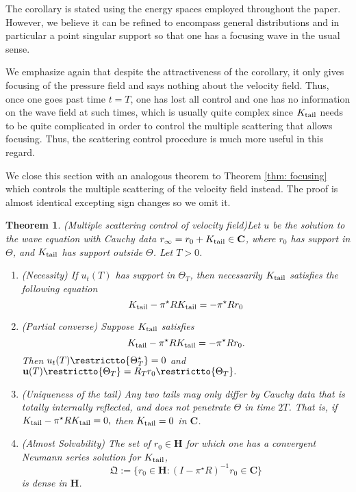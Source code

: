 \documentclass[10pt]{article}
\theoremstyle{plain}
\newtheorem{theorem}{Theorem}
\theoremstyle{definition}
\theoremstyle{remark}
\numberwithin{theorem}{section}
\numberwithin{example}{section}
\numberwithin{equation}{section}
\numberwithin{figure}{section}
\def\beq{\begin{equation} }
\def\eeq{\end{equation}}
\newcommand\tail{_{\textup{tail}}}
\begin{document}
The corollary is stated using the energy spaces employed throughout the paper. However, we believe it can be refined to encompass general distributions and in particular a point singular support so that one has a focusing wave in the usual sense.
\begin{rem}
We emphasize again that despite the attractiveness of the corollary, it only gives focusing of the pressure field and says nothing about the velocity field. Thus, once one goes past time $t=T$, one has lost all control and one has no information on the wave field at such times, which is usually quite complex since $K\tail$ needs to be quite complicated in order to control the multiple scattering that allows focusing. Thus, the scattering control procedure is much more useful in this regard.
\end{rem}

We close this section with an analogous theorem to Theorem \ref{thm: focusing} which controls the multiple scattering of the velocity field instead. The proof is almost identical excepting sign changes so we omit it.
\begin{theorem} (Multiple scattering control of velocity field)\label{thm: focusing velocity}
 Let $u$ be the solution to the wave equation with Cauchy data $r_{\infty} = r_0 + K\tail \in \mathbf{C}$, where $r_0$ has support in $\Theta$, and $K\tail$ has support outside $\Theta$. Let $T>0$.
\begin{enumerate}
\item[(i)](Necessity)
If $u_t(T)$ has support in $\Theta_T$, then necessarily $K\tail$ satisfies the following equation
\beq{
K\tail - \pi^\star RK\tail = -\pi^\star Rr_0
\nonumber
}\eeq

\item[(ii)](Partial converse) Suppose $K\tail$ satisfies
$$ K\tail - \pi^\star RK\tail = -\pi^\star Rr_0.$$
Then $u_t(T) \restrictto{\Theta^\star_T}= 0$ and $\mathbf{u}(T) \restrictto{\Theta_T} = R_Tr_0 \restrictto{\Theta_T}.$

\item[(iii)](Uniqueness of the tail) Any two tails may only differ by Cauchy data that is totally internally reflected, and does not penetrate $\Theta$ in time $2T$. That is, if
    $K\tail - \pi^\star RK\tail = 0,$
    then $K\tail =0$ in $\mathbf{C}$.
\item[(iv)](Almost Solvability) The set of $r_0 \in \mathbf H$ for which one has a convergent Neumann series solution for $K\tail$,
    $$ \mathfrak{Q} := \{ r_0 \in \mathbf H : (I-\pi^\star R)^{-1}r_0 \in \mathbf C \}$$
    is dense in $\mathbf H$.
\end{enumerate}
\end{theorem}
\end{document}
